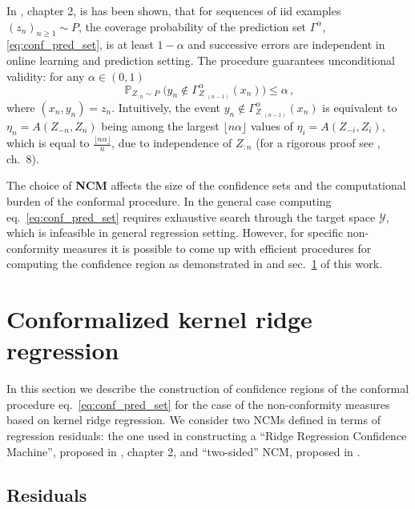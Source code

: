 \documentclass[conference]{IEEEtran}
\newcommand{\pr}{\mathop{\mathbb{P}}\nolimits}
\newcommand{\Ycal}{\mathcal{Y}}
\begin{document}
In \cite{vovk2005}, chapter 2, is has been shown, that for sequences of iid examples
$(z_n)_{n \geq1} \sim P$, the coverage probability of the prediction set $\Gamma^\alpha$,
\ref{eq:conf_pred_set}, is at least $1-\alpha$ and successive errors are independent
in online learning and prediction setting. The procedure guarantees unconditional validity: 
for any $\alpha \in (0,1)$
\begin{equation} \label{eq:conservative_coverage}
  \pr_{Z_{:n}\sim P} \bigl(
    y_n \notin \Gamma^\alpha_{Z_{:(n-1)}}(x_n)
  \bigr) \leq \alpha \,,
\end{equation} 
where $(x_n, y_n) = z_n$.
Intuitively, the event $y_n \notin \Gamma^\alpha_{Z_{:(n-1)}}(x_n)$ is equivalent
to $\eta_n = A(Z_{-n}, Z_n)$ being among the largest $\lfloor n\alpha\rfloor$ values
of $\eta_i = A(Z_{-i}, Z_i)$, which is equal to $\frac{\lfloor n\alpha\rfloor}{n}$,
due to independence of $Z_{:n}$ (for a rigorous proof see \cite{vovk2005}, ch.~8).

The choice of \textbf{NCM} affects the size of the confidence sets and the computational
burden of the conformal procedure. In the general case computing eq.~\ref{eq:conf_pred_set}
requires exhaustive search through the target space $\Ycal$, which is infeasible in general
regression setting. However, for specific non-conformity measures it is possible to
come up with efficient procedures for computing the confidence region as demonstrated
in \cite{vovk2005} and sec.~\ref{sec:conformalized_krr} of this work.


\section{Conformalized kernel ridge regression} %
\label{sec:conformalized_krr}

In this section we describe the construction of confidence regions of the conformal
procedure eq.~\ref{eq:conf_pred_set} for the case of the non-conformity measures
based on kernel ridge regression. We consider two NCMs defined in terms of regression
residuals: the one used in constructing a ``Ridge Regression Confidence Machine'',
proposed in \cite{vovk2005}, chapter 2, and ``two-sided'' NCM, proposed in \cite{burnaevV14}.

\subsection{Residuals} %
\label{sub:residuals}
\end{document}

